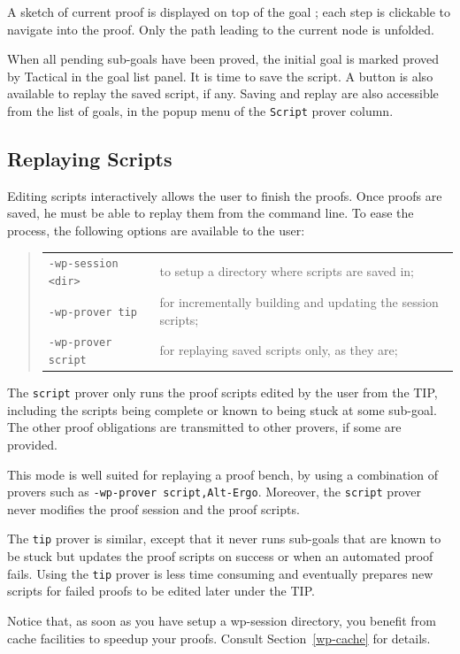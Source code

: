 A sketch of current proof is displayed on top of the goal ; each step is clickable to navigate into the proof. Only the path leading to the current node is unfolded.

When all pending sub-goals have been proved, the initial goal is marked proved by \textsf{Tactical} in the goal list panel. It is time to save the script. A button is also available to replay the saved script, if any. Saving and replay are also accessible from the list of goals, in the popup menu of the \texttt{Script} prover column.

\subsection{Replaying Scripts}

Editing scripts interactively allows the user to finish the proofs. Once proofs are saved, he must be able to replay them from the command line. To ease the process, the following options are available to the user:
\begin{quote}
\begin{tabular}{ll}
\verb+-wp-session <dir>+ & to setup a directory where scripts are saved in; \\
\verb+-wp-prover tip+ & for incrementally building and updating the session scripts;\\
\verb+-wp-prover script+ & for replaying saved scripts only, as they are;\\
\end{tabular}
\end{quote}

The \verb+script+ prover only runs the proof scripts edited by the user from the TIP, including the scripts being complete or known to being stuck at some sub-goal. The other proof obligations are transmitted to other provers, if some are provided.

This mode is well suited for replaying a proof bench, by using a combination of provers such as \verb+-wp-prover script,Alt-Ergo+. Moreover, the \verb+script+ prover never modifies the proof session and the proof scripts.

The \verb+tip+ prover is similar, except that it never runs sub-goals that are known to be stuck but updates the proof scripts on success or when an automated proof fails. Using the \verb+tip+ prover is less time consuming and eventually prepares new scripts for failed proofs to be edited later under the TIP.

Notice that, as soon as you have setup a wp-session directory, you benefit from cache facilities to speedup your proofs. Consult Section~\ref{wp-cache} for details.

